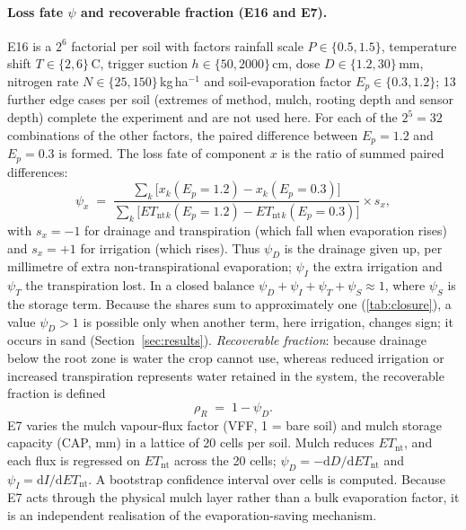 \documentclass[preprint,12pt,authoryear]{elsarticle}
\newcommand{\Ent}{\mathit{ET}_{\mathrm{nt}}}
\begin{document}
\paragraph{Loss fate $\psi$ and recoverable fraction (E16 and E7).}
E16 is a $2^6$ factorial per soil with factors rainfall scale $P\in\{0.5,1.5\}$, temperature shift $T\in\{2,6\}$\,\textdegree C, trigger suction $h\in\{50,2000\}$\,cm, dose $D\in\{1.2,30\}$\,mm, nitrogen rate $N\in\{25,150\}$\,kg\,ha$^{-1}$ and soil-evaporation factor $E_p\in\{0.3,1.2\}$; 13 further edge cases per soil (extremes of method, mulch, rooting depth and sensor depth) complete the experiment and are not used here. For each of the $2^5=32$ combinations of the other factors, the paired difference between $E_p=1.2$ and $E_p=0.3$ is formed. The loss fate of component $x$ is the ratio of summed paired differences:
\begin{equation}
\psi_x \;=\; \frac{\sum_{k}\bigl[x_k(E_p{=}1.2)-x_k(E_p{=}0.3)\bigr]}{\sum_{k}\bigl[\Ent{}_k(E_p{=}1.2)-\Ent{}_k(E_p{=}0.3)\bigr]}\times s_x,
\label{eq:psi}
\end{equation}
with $s_x=-1$ for drainage and transpiration (which fall when evaporation rises) and $s_x=+1$ for irrigation (which rises). Thus $\psi_D$ is the drainage given up, per millimetre of extra non-transpirational evaporation; $\psi_I$ the extra irrigation and $\psi_T$ the transpiration lost. In a closed balance $\psi_D+\psi_I+\psi_T+\psi_S\approx1$, where $\psi_S$ is the storage term. Because the shares sum to approximately one (\cref{tab:closure}), a value $\psi_D>1$ is possible only when another term, here irrigation, changes sign; it occurs in sand (Section~\ref{sec:results}). \emph{Recoverable fraction}: because drainage below the root zone is water the crop cannot use, whereas reduced irrigation or increased transpiration represents water retained in the system, the recoverable fraction is defined
\begin{equation}
\rho_R \;=\; 1-\psi_D .
\label{eq:rec}
\end{equation}
E7 varies the mulch vapour-flux factor (VFF, 1 = bare soil) and mulch storage capacity (CAP, mm) in a lattice of 20 cells per soil. Mulch reduces $\Ent$, and each flux is regressed on $\Ent$ across the 20 cells; $\psi_D=-\mathrm{d}D/\mathrm{d}\Ent$ and $\psi_I=\mathrm{d}I/\mathrm{d}\Ent$. A bootstrap confidence interval over cells is computed. Because E7 acts through the physical mulch layer rather than a bulk evaporation factor, it is an independent realisation of the evaporation-saving mechanism.
\end{document}
